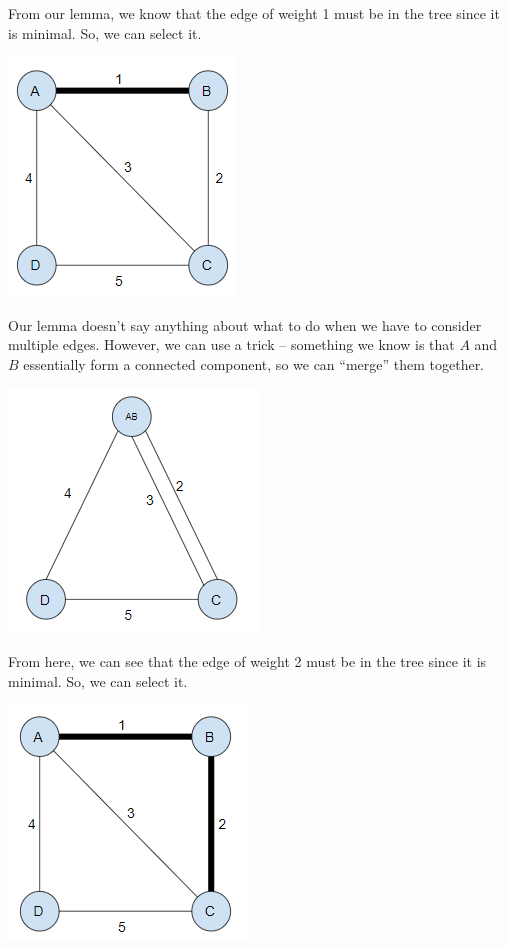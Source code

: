 \documentclass[letterpaper]{article}
\begin{document}
\begin{mdframed}[]
    From our lemma, we know that the edge of weight 1 must be in the tree since it is minimal. So, we can select it. 
    \begin{center}
        \includegraphics[scale=0.8]{../assets/mst_2.png}
    \end{center}
    Our lemma doesn't say anything about what to do when we have to consider multiple edges. However, we can use a trick -- something we know is that $A$ and $B$ essentially form a connected component, so we can ``merge'' them together.
    \begin{center}
        \includegraphics[scale=0.8]{../assets/mst_2a.png}
    \end{center}
    From here, we can see that the edge of weight 2 must be in the tree since it is minimal. So, we can select it. 
    \begin{center}
        \includegraphics[scale=0.8]{../assets/mst_3.png}

\end{center}
\end{mdframed}
\end{document}
